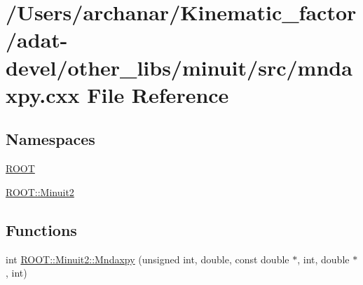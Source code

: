 \hypertarget{adat-devel_2other__libs_2minuit_2src_2mndaxpy_8cxx}{}\section{/\+Users/archanar/\+Kinematic\+\_\+factor/adat-\/devel/other\+\_\+libs/minuit/src/mndaxpy.cxx File Reference}
\label{adat-devel_2other__libs_2minuit_2src_2mndaxpy_8cxx}
\subsection*{Namespaces}
\begin{DoxyCompactItemize}
\item 
 \mbox{\hyperlink{namespaceROOT}{R\+O\+OT}}
\item 
 \mbox{\hyperlink{namespaceROOT_1_1Minuit2}{R\+O\+O\+T\+::\+Minuit2}}
\end{DoxyCompactItemize}
\subsection*{Functions}
\begin{DoxyCompactItemize}
\item 
int \mbox{\hyperlink{namespaceROOT_1_1Minuit2_a4784db8e0b280e76eb6f8b00e2b395dd}{R\+O\+O\+T\+::\+Minuit2\+::\+Mndaxpy}} (unsigned int, double, const double $\ast$, int, double $\ast$, int)
\end{DoxyCompactItemize}

